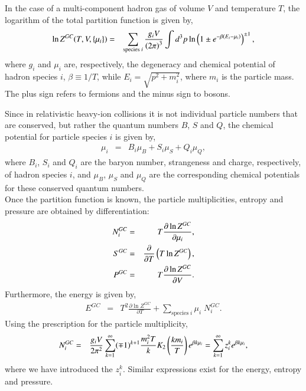 \documentclass{elsarticle}
\begin{document}
In the case of a multi-component hadron gas of volume $V$ and temperature $T$, the 
logarithm of the total partition 
function is given by,
\begin{eqnarray}
\ln Z^{GC}(T,V,\{\mu_i\}) &=& \sum_{\mathrm{species}\;i}{g_iV\over\left(2\pi\right)^3}\int d^3p\ln\left(1\pm e^{-\beta\left(E_i-\mu_i\right)}\right)^{\pm1},
                          \end{eqnarray}
where $g_i$ and $\mu_i$ are, respectively, the degeneracy and chemical potential 
of hadron species $i$, $\beta\equiv 1/T$, while $E_i=\sqrt{p^2+m_i^2}$, where $m_i$ is the particle 
mass. The plus sign refers to fermions and the minus sign to bosons.

Since in relativistic heavy-ion collisions it is not individual particle numbers 
that are conserved, but rather the quantum numbers $B$, $S$ and $Q$, the chemical 
potential for particle species $i$ is given by,
\begin{eqnarray}
\mu_i &=& B_i\mu_B + S_i\mu_S + Q_i\mu_Q,
\end{eqnarray}
where $B_i$, $S_i$ and $Q_i$ are the baryon number, strangeness and charge, respectively, of hadron species 
$i$, and $\mu_B$, $\mu_S$ and $\mu_Q$ are the corresponding chemical potentials for 
these conserved quantum numbers.\\

Once the partition function is known, the particle 
multiplicities, entropy and pressure are obtained by differentiation: 
\begin{eqnarray}
N_i^{GC} &=& T{\partial\ln Z^{GC}\over\partial\mu_i},\\
S^{GC} &=& {\partial\over\partial T}\left(T\ln Z^{GC}\right),\\ 
P^{GC} &=& T{\partial\ln Z^{GC}\over\partial V}.
\end{eqnarray}
Furthermore, the energy is given by,
\begin{eqnarray}
E^{GC} &=& T^2\frac{\partial \ln Z^{GC}}{\partial T} + \sum_{\mathrm{species}\;i}\mu_i\;N_i^{GC}.
\end{eqnarray}
Using the prescription for the particle multiplicity, 
\begin{eqnarray}
N_i^{GC} &=& {g_iV \over 2\pi^2}\sum_{k=1}^{\infty}(\mp
  1)^{k+1}{m_i^2 T\over k}
  K_2\left(km_i\over T\right)e^{\beta k\mu_i}=\sum_{k=1}^{\infty}z_i^k e^{\beta k \mu_i},\label{density}
\end{eqnarray}
where we have introduced the $z_i^k$. Similar expressions exist for the energy, entropy and pressure.\\
\end{document}
